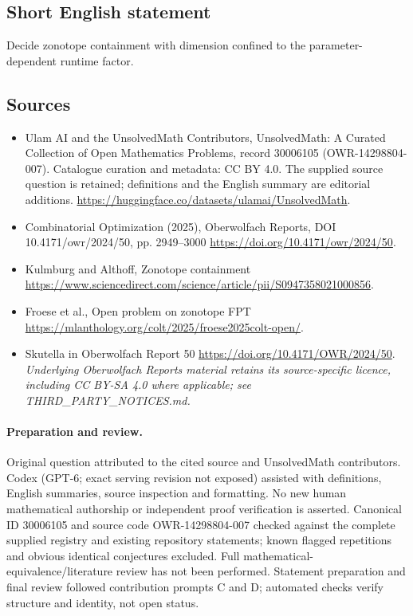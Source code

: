 \documentclass[11pt]{article}
\begin{document}
\subsection{Short English statement}
Decide zonotope containment with dimension confined to the parameter-dependent runtime factor.
\subsection{Sources}
\begin{itemize}
\item[\hypertarget{source:30006105:1}{S1}] Ulam AI and the UnsolvedMath Contributors, UnsolvedMath: A Curated Collection of Open Mathematics Problems, record 30006105 (OWR-14298804-007). Catalogue curation and metadata: CC BY 4.0. The supplied source question is retained; definitions and the English summary are editorial additions.
\url{https://huggingface.co/datasets/ulamai/UnsolvedMath}.
\item[\hypertarget{source:30006105:2}{S2}] Combinatorial Optimization (2025), Oberwolfach Reports, DOI 10.4171/owr/2024/50, pp. 2949--3000
\url{https://doi.org/10.4171/owr/2024/50}.
\item[\hypertarget{source:30006105:3}{S3}] Kulmburg and Althoff, Zonotope containment
\url{https://www.sciencedirect.com/science/article/pii/S0947358021000856}.
\item[\hypertarget{source:30006105:4}{S4}] Froese et al., Open problem on zonotope FPT
\url{https://mlanthology.org/colt/2025/froese2025colt-open/}.
\item[\hypertarget{source:30006105:5}{S5}] Skutella in Oberwolfach Report 50
\url{https://doi.org/10.4171/OWR/2024/50}.
\textit{Underlying Oberwolfach Reports material retains its source-specific licence, including CC BY-SA 4.0 where applicable; see THIRD\_PARTY\_NOTICES.md.}
\end{itemize}
\paragraph{Preparation and review.}
Original question attributed to the cited source and UnsolvedMath contributors. Codex (GPT-6; exact serving revision not exposed) assisted with definitions, English summaries, source inspection and formatting. No new human mathematical authorship or independent proof verification is asserted. Canonical ID 30006105 and source code OWR-14298804-007 checked against the complete supplied registry and existing repository statements; known flagged repetitions and obvious identical conjectures excluded. Full mathematical-equivalence/literature review has not been performed. Statement preparation and final review followed contribution prompts C and D; automated checks verify structure and identity, not open status.
\label{end:30006105}
\end{document}
